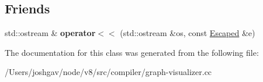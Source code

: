 \subsection*{Friends}
\begin{DoxyCompactItemize}
\item 
std\+::ostream \& {\bfseries operator$<$$<$} (std\+::ostream \&os, const \hyperlink{classv8_1_1internal_1_1compiler_1_1_escaped}{Escaped} \&e)\hypertarget{classv8_1_1internal_1_1compiler_1_1_escaped_a8c282daa1fc00a5368c3c6cd0457d41f}{}\label{classv8_1_1internal_1_1compiler_1_1_escaped_a8c282daa1fc00a5368c3c6cd0457d41f}

\end{DoxyCompactItemize}


The documentation for this class was generated from the following file\+:\begin{DoxyCompactItemize}
\item 
/\+Users/joshgav/node/v8/src/compiler/graph-\/visualizer.\+cc\end{DoxyCompactItemize}
